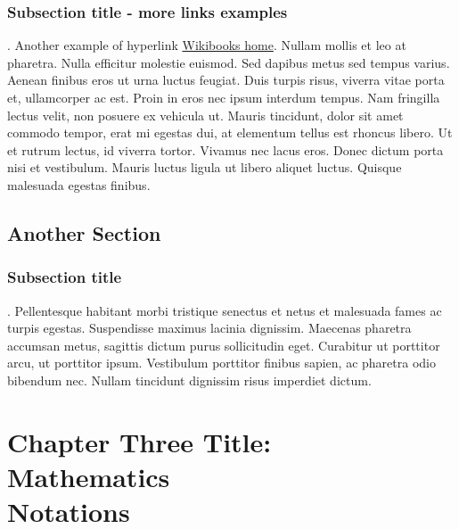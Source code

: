 \subsection{Subsection title - more links examples}.
Another example of hyperlink \href{http://www.wikibooks.org}{Wikibooks home}. Nullam mollis et leo at pharetra. Nulla efficitur molestie euismod. Sed dapibus metus sed tempus varius. Aenean finibus eros ut urna luctus feugiat. Duis turpis risus, viverra vitae porta et, ullamcorper ac est. Proin in eros nec ipsum interdum tempus. Nam fringilla lectus velit, non posuere ex vehicula ut. Mauris tincidunt, dolor sit amet commodo tempor, erat mi egestas dui, at elementum tellus est rhoncus libero. Ut et rutrum lectus, id viverra tortor. Vivamus nec lacus eros. Donec dictum porta nisi et vestibulum. Mauris luctus ligula ut libero aliquet luctus. Quisque malesuada egestas finibus.

\section{Another Section}
\subsection{Subsection title}.
Pellentesque habitant morbi tristique senectus et netus et malesuada fames ac turpis egestas. Suspendisse maximus lacinia dignissim. Maecenas pharetra accumsan metus, sagittis dictum purus sollicitudin eget. Curabitur ut porttitor arcu, ut porttitor ipsum. Vestibulum porttitor finibus sapien, ac pharetra odio bibendum nec. Nullam tincidunt dignissim risus imperdiet dictum.

\chapter[Chapter Three Title: Mathematics Notations]{Chapter Three Title:\\ Mathematics\\ Notations}
